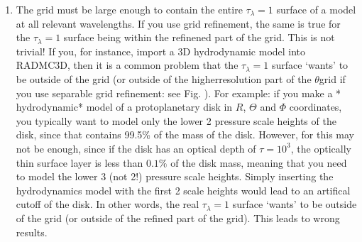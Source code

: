 \documentclass[letterpaper,10pt,english]{sphinxmanual}
\begin{document}
\begin{enumerate}
\item {} 

The grid must be large enough to contain the entire \(\tau_\lambda=1\)
surface of a model at all relevant wavelengths. If you use grid refinement,
the same is true for the \(\tau_\lambda=1\) surface being within the
refinened part of the grid. This is not trivial!  If you, for instance,
import a 3\sphinxhyphen{}D hydrodynamic model into RADMC\sphinxhyphen{}3D, then it is a common problem
that the \(\tau_\lambda=1\) surface ‘wants’ to be outside of the grid (or
outside of the higher\sphinxhyphen{}resolution part of the \(\theta\)\sphinxhyphen{}grid if you use
separable grid refinement: see Fig. ). For example:
if you make a * hydrodynamic* model of a protoplanetary disk in \(R\),
\(\Theta\) and \(\Phi\) coordinates, you typically want to model only
the lower 2 pressure scale heights of the disk, since that contains 99.5\% of
the mass of the disk. However, for  this may not be
enough, since if the disk has an optical depth of \(\tau=10^3\), the
optically thin surface layer is less than \(0.1\%\) of the disk mass,
meaning that you need to model the lower 3 (not 2!) pressure scale
heights. Simply inserting the hydrodynamics model with the first 2 scale
heights would lead to an artifical cut\sphinxhyphen{}off of the disk. In other words, the
real \(\tau_\lambda=1\) surface ‘wants’ to be outside of the grid (or
outside of the refined part of the grid). This leads to wrong results.

\end{enumerate}
\end{document}
